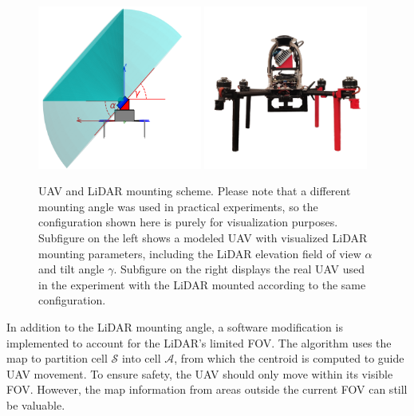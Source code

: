             \begin{figure}[htbp]
                \centering
                \includegraphics[width=0.48\textwidth]{./fig/photos/uav_side_view.png}
                \includegraphics[width=0.48\textwidth]{./fig/photos/uav_photo.png}
                \caption{
                    \ac{UAV} and \ac{LiDAR} mounting scheme.
                    Please note that a different mounting angle was used in practical experiments, so the configuration shown here is purely for visualization purposes.
                    Subfigure on the left shows a modeled \ac{UAV} with visualized \ac{LiDAR} mounting parameters, including the \ac{LiDAR} elevation field of view $\alpha$ and tilt angle $\gamma$. 
                    Subfigure on the right displays the real \ac{UAV} used in the experiment with the \ac{LiDAR} mounted according to the same configuration.                                                
                }
                \label{fig:uavs}
            \end{figure}

            In addition to the \ac{LiDAR} mounting angle, a software modification is implemented to account for the \ac{LiDAR}'s limited \ac{FOV}.
            The algorithm uses the map to partition cell $\mathcal{S}$ into cell $\mathcal{A}$, from which the centroid is computed to guide \ac{UAV} movement.
            To ensure safety, the \ac{UAV} should only move within its visible \ac{FOV}. 
            However, the map information from areas outside the current \ac{FOV} can still be valuable. 

